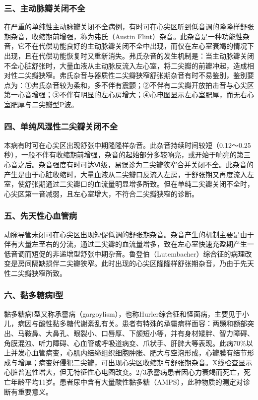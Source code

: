 \subsubsection{三、主动脉瓣关闭不全}

在严重的单纯性主动脉瓣关闭不全病例，有时可在心尖区听到低音调的隆隆样舒张期杂音，收缩期前增强，称为弗氏（Austin
Flint）杂音。此杂音是一种功能性杂音，它不在代偿功能良好的主动脉瓣关闭不全中出现，而仅在左心室衰竭的情况下出现，且在代偿功能恢复时又重新消失。弗氏杂音的发生机制是：当主动脉瓣关闭不全心脏舒张时，大量血液从主动脉反流入左心室，将二尖瓣的前瓣冲起，造成相对性二尖瓣狭窄。弗氏杂音与器质性二尖瓣狭窄舒张期杂音有时不易鉴别，鉴别要点为：①弗氏杂音较为柔和，多不伴有震颤；②不伴有二尖瓣开放拍击音与心尖区第一心音增强；③不伴有明显的左心房增大；④心电图显示左心室肥厚，而无右心室肥厚与二尖瓣型P波。

\subsubsection{四、单纯风湿性二尖瓣关闭不全}

本病有时可在心尖区出现舒张中期隆隆样杂音。此杂音持续时间较短（0.12～0.25秒），一般不伴有收缩期前增强，杂音的起始部分多较响亮，或开始于响亮的第三心音之后。杂音强度有时可达Ⅵ级，易误诊为二尖瓣狭窄合并关闭不全。此杂音的产生是由于心脏收缩时，大量血液从二尖瓣口反流入左房，于舒张期又再度流入左室，使舒张期通过二尖瓣口的血流量明显增多所致。但在单纯二尖瓣关闭不全时，心尖区第一音减弱，且左心室增大，不符合二尖瓣狭窄的诊断。

\subsubsection{五、先天性心血管病}

动脉导管未闭可在心尖区出现短促低调的舒张期杂音。杂音产生的机制主要是由于伴有大量左至右的分流，通过二尖瓣的血流量增多，致在左心室快速充盈期产生一低音调而短促的非递增型舒张中期杂音。鲁登伯（Lutembacher）综合征的病理改变是房间隔缺损伴二尖瓣狭窄。此时出现的心尖区隆隆样舒张期杂音，乃由于先天性二尖瓣狭窄所致。

\subsubsection{六、黏多糖病Ⅰ型}

黏多糖病Ⅰ型又称承霤病（gargoylism），也称Hurler综合征和怪面病，主要见于小儿，病因与酸性黏多糖代谢紊乱有关。患者有特殊的承霤病样面容：两颞和额部突出、马鞍鼻、大鼻孔、眼裂小、口唇厚、下颌短小等，并有身材矮胖、智力障碍、角膜混浊、听力障碍、心血管或呼吸道病变、爪状手、肝脾大等表现。此病70\%以上并发心血管病变，心肌内结缔组织细胞肿胀、肥大与空泡形成，心瓣膜有结节形成与增厚；病变好侵犯二尖瓣，可出现心尖区收缩期与舒张期杂音。X线检查显示心脏普遍性增大，但无特征性心电图改变。2/3承霤病患者因心力衰竭而死亡，死亡年龄平均11岁。患者尿中含有大量酸性黏多糖（AMPS），此种物质的测定对诊断有重要意义。


